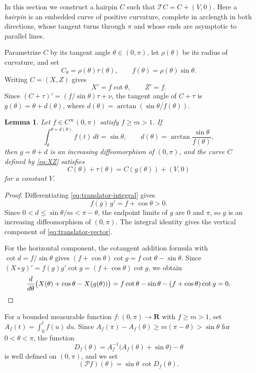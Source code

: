 \documentclass[11pt]{article}
\numberwithin{equation}{section}
\newtheorem{lemma}[theorem]{Lemma}
\newcommand{\R}{\mathbf{R}}
\newcommand{\Tmap}{\mathcal T}
\begin{document}
In this section we construct a hairpin \(C\) such that \(\Tmap C=C+(V,0)\).
Here a \emph{hairpin} is an embedded curve of positive curvature, complete in
arclength in both directions, whose tangent turns through \(\pi\) and whose
ends are asymptotic to parallel lines.

Parametrize \(C\) by its tangent angle \(\theta\in(0,\pi)\), let \(\rho(\theta)\) be its radius
of curvature, and set
\[
  C_\theta=\rho(\theta)\tau(\theta),\qquad
  f(\theta)=\rho(\theta)\sin\theta.
\]
Writing \(C=(X,Z)\) gives
\begin{equation}\label{eq:XZ}
  X'=f\cot\theta,\qquad Z'=f.
\end{equation}
Since \((C+\tau)'=(f/\sin\theta)\tau+\nu\), the tangent angle of \(C+\tau\)
is \(g(\theta)=\theta+d(\theta)\), where
\(d(\theta)=\arctan(\sin\theta/f(\theta))\).

\begin{lemma}\label{lem:translator-equation}
Let \(f\in C^\infty(0,\pi)\) satisfy \(f\geq m>1\). If
\begin{equation}\label{eq:translator-integral}
  \int_\theta^{\theta+d(\theta)}f(t)\,dt=\sin\theta,
  \qquad d(\theta)=\arctan\frac{\sin\theta}{f(\theta)},
\end{equation}
then \(g=\theta+d\) is an increasing diffeomorphism of \((0,\pi)\), and the
curve \(C\) defined by \eqref{eq:XZ} satisfies
\begin{equation}\label{eq:translator-vector}
  C(\theta)+\tau(\theta)=C(g(\theta))+(V,0)
\end{equation}
for a constant \(V\).
\end{lemma}

\begin{proof}
Differentiating \eqref{eq:translator-integral} gives
\[
  f(g)\,g'=f+\cos\theta>0.
\]
Since \(0<d\leq\sin\theta/m<\pi-\theta\), the endpoint limits of \(g\)
are \(0\) and \(\pi\), so \(g\) is an increasing diffeomorphism of
\((0,\pi)\). The integral identity gives the vertical component of
\eqref{eq:translator-vector}.

For the horizontal component, the cotangent addition formula with
\(\cot d=f/\sin\theta\) gives \((f+\cos\theta)\cot g=f\cot\theta-\sin\theta\).
Since \((X\circ g)'=f(g)g'\cot g=(f+\cos\theta)\cot g\), we obtain
\[
  \frac d{d\theta}\bigl(X(\theta)+\cos\theta-X(g(\theta))\bigr)
  =f\cot\theta-\sin\theta-(f+\cos\theta)\cot g=0.
  \qedhere
\]
\end{proof}

For a bounded measurable function \(f:(0,\pi)\to\R\) with
\(f\geq m>1\), set \(A_f(t)=\int_0^t f(u)\,du\). Since
\(A_f(\pi)-A_f(\theta)\geq m(\pi-\theta)>\sin\theta\) for \(0<\theta<\pi\), the
function
\[
  D_f(\theta)=A_f^{-1}\bigl(A_f(\theta)+\sin\theta\bigr)-\theta
\]
is well defined on \((0,\pi)\), and we set
\[
  (\mathcal P f)(\theta)=\sin\theta\,\cot D_f(\theta).
\]
\end{document}
